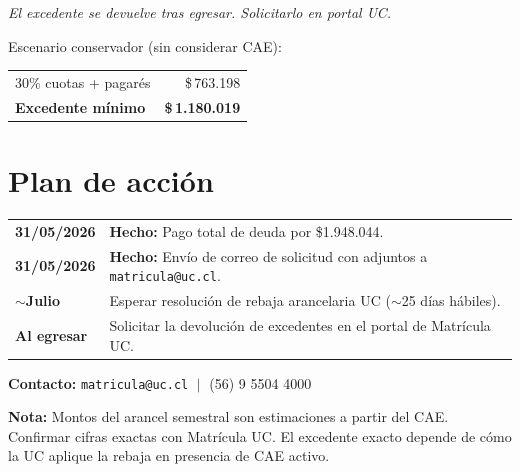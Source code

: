\documentclass[10pt,a4paper]{article}
\begin{document}
\begin{minipage}[t]{0.50\textwidth}
{\vspace{3pt}
\textit{El excedente se devuelve tras egresar. Solicitarlo en portal UC.}

\vspace{3pt}
Escenario conservador (sin considerar CAE):
\begin{tabular}{@{}lr@{}}
  30\% cuotas + pagarés & \$\,763.198   \\
  \textbf{Excedente mínimo} & \textbf{\$\,1.180.019} \\
\end{tabular}
}

\vspace{6pt}

\section{Plan de acción}

{\small
\begin{tabular}{@{}p{1.8cm}p{6cm}@{}}
  \textbf{31/05/2026}  & \textbf{Hecho:} Pago total de deuda por \$1.948.044. \\[2pt]
  \textbf{31/05/2026}  & \textbf{Hecho:} Envío de correo de solicitud con adjuntos a \texttt{matricula@uc.cl}. \\[2pt]
  \textbf{$\sim$Julio} & Esperar resolución de rebaja arancelaria UC ($\sim$25 días hábiles). \\[2pt]
  \textbf{Al egresar}  & Solicitar la devolución de excedentes en el portal de Matrícula UC. \\
\end{tabular}

\vspace{4pt}
\textbf{Contacto:} \texttt{matricula@uc.cl} $\;|\;$ (56) 9 5504 4000
}

\end{minipage}

\vspace{6pt}

\begin{mdframed}[backgroundcolor=lightyellow,linewidth=0.5pt,
    innertopmargin=3pt,innerbottommargin=3pt,innerleftmargin=5pt,innerrightmargin=5pt]
  {\small\textbf{Nota:} Montos del arancel semestral son estimaciones a partir del CAE.
  Confirmar cifras exactas con Matrícula UC. El excedente exacto depende de cómo la UC
  aplique la rebaja en presencia de CAE activo.}
\end{mdframed}
\end{document}
